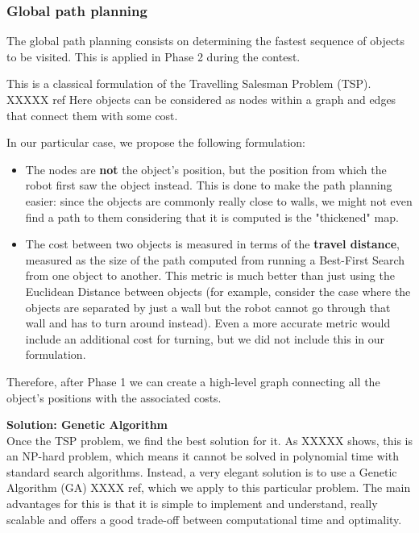 \subsubsection{Global path planning}
The global path planning consists on determining the fastest sequence of objects to be visited. This is applied in Phase 2 during the contest. 

This is a classical formulation of the Travelling Salesman Problem (TSP). XXXXX ref Here objects can be considered as nodes within a graph and edges that connect them with some cost.

In our particular case, we propose the following formulation:
\begin{itemize}
\item The nodes are \textbf{not} the object's position, but the position from which the robot first saw the object instead. This is done to make the path planning easier: since the objects are commonly really close to walls, we might not even find a path to them considering that it is computed is the "thickened" map. 
\item The cost between two objects is measured in terms of the \textbf{travel distance}, measured as the size of the path computed from running a Best-First Search from one object to another. This metric is much better than just using the Euclidean Distance between objects (for example, consider the case where the objects are separated by just a wall but the robot cannot go through that wall and has to turn around instead). Even a more accurate metric would include an additional cost for turning, but we did not include this in our formulation.
\end{itemize}

Therefore, after Phase 1 we can create a high-level graph connecting all the object's positions with the associated costs. 

\textbf{Solution: Genetic Algorithm}\\
Once the TSP problem, we find the best solution for it. As XXXXX shows, this is an NP-hard problem, which means it cannot be solved in polynomial time with standard search algorithms. Instead, a very elegant solution is to use a Genetic Algorithm (GA) XXXX ref, which we apply to this particular problem. The main advantages for this is that it is simple to implement and understand, really scalable and offers a good trade-off between computational time and optimality. 

